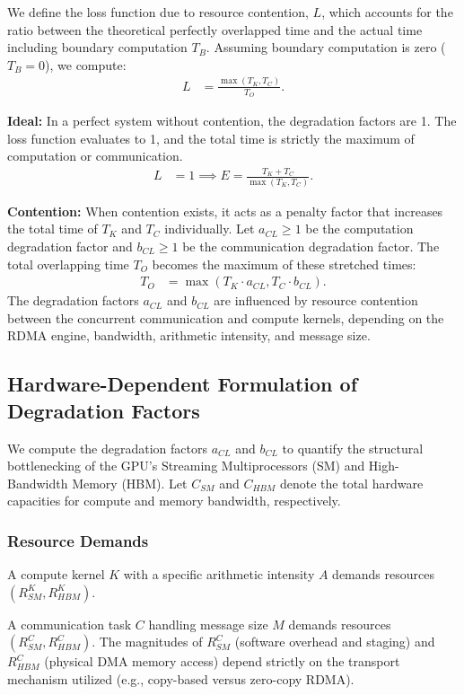 \documentclass[twocolumn, secnumarabic, amssymb, nobibnotes, aps, prd, amsmath, nofootinbib]{revtex4-2}
\begin{document}
We define the loss function due to resource contention, $L$, which accounts for the ratio between the theoretical perfectly overlapped time and the actual time including boundary computation $T_B$. Assuming boundary computation is zero ($T_{B} = 0$), we compute:
\begin{align*}
    L &= \frac{\max(T_K, T_C)}{T_O}.
\end{align*}

\textbf{Ideal:} In a perfect system without contention, the degradation factors are 1. The loss function evaluates to 1, and the total time is strictly the maximum of computation or communication.
\begin{align*}
    L &= 1 \implies E = \frac{T_K + T_C}{\max(T_K, T_C)}.
\end{align*}

\textbf{Contention:} When contention exists, it acts as a penalty factor that increases the total time of $T_K$ and $T_C$ individually. Let $a_{CL} \geq 1$ be the computation degradation factor and $b_{CL} \geq 1$ be the communication degradation factor. The total overlapping time $T_O$ becomes the maximum of these stretched times:
\begin{align*}
    T_O &= \max(T_K \cdot a_{CL}, T_C \cdot b_{CL}).
\end{align*}
The degradation factors $a_{CL}$ and $b_{CL}$ are influenced by resource contention between the concurrent communication and compute kernels, depending on the RDMA engine, bandwidth, arithmetic intensity, and message size.

\subsection{Hardware-Dependent Formulation of Degradation Factors}

We compute the degradation factors $a_{CL}$ and $b_{CL}$ to quantify the structural bottlenecking of the GPU's Streaming Multiprocessors (SM) and High-Bandwidth Memory (HBM). Let $C_{SM}$ and $C_{HBM}$ denote the total hardware capacities for compute and memory bandwidth, respectively.

\subsubsection{Resource Demands}
A compute kernel $K$ with a specific arithmetic intensity $A$ demands resources $(R_{SM}^K, R_{HBM}^K)$.

A communication task $C$ handling message size $M$ demands resources $(R_{SM}^C, R_{HBM}^C)$. The magnitudes of $R_{SM}^C$ (software overhead and staging) and $R_{HBM}^C$ (physical DMA memory access) depend strictly on the transport mechanism utilized (e.g., copy-based versus zero-copy RDMA).
\end{document}
